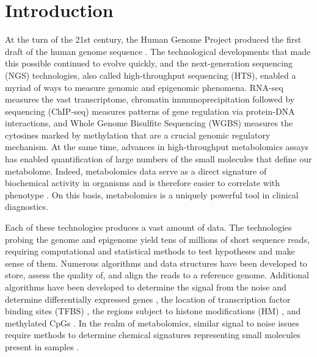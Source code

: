 
\section{Introduction}

At the turn of the 21st century, the Human Genome Project produced the first draft of the human genome sequence \cite{Lander:2001hk}. The technological developments that made this possible continued to evolve quickly, and the next-generation sequencing (NGS) technologies, also called high-throughput sequencing (HTS), enabled a myriad of ways to measure genomic and epigenomic phenomena. RNA-seq measures the vast transcriptome, chromatin immunoprecipitation followed by sequencing (ChIP-seq) measures patterns of gene regulation via protein-DNA interactions, and Whole Genome Bisulfite Sequencing (WGBS) measures the cytosines marked by methylation that are a crucial genomic regulatory mechanism. At the same time, advances in high-throughput metabolomics assays has enabled quantification of large numbers of the small molecules that define our metabolome. Indeed, metabolomics data serve as a direct signature of biochemical activity in organisms and is therefore easier to correlate with phenotype \cite{Patti:2012ek}. On this basis, metabolomics is a uniquely powerful tool in clinical diagnostics.

Each of these technologies produces a vast amount of data. The technologies probing the genome and epigenome yield tens of millions of short sequence reads, requiring computational and statistical methods to test hypotheses and make sense of them. Numerous algorithms and data structures have been developed to store, assess the quality of, and align the reads to a reference genome. Additional algorithms have been developed to determine the signal from the noise and determine differentially expressed genes \cite{Robinson:2010cw, Love:2014ka}, the location of transcription factor binding sites (TFBS) \cite{Zhang:2008gm}, the regions subject to histone modifications (HM) \cite{Xu:2014eh, Zhang:2014cu}, and methylated CpGs \cite{Krueger:2011eb}. In the realm of metabolomics, similar signal to noise issues require methods to determine chemical signatures representing small molecules present in samples \cite{Patti:2012ek}.

